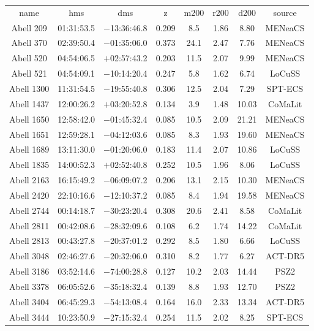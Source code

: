 \begin{table}
\begin{tabular}{cccccccc}
name & hms & dms & z & m200 & r200 & d200 & source \\
Abell 209 & 01:31:53.5 & $-$13:36:46.8 & 0.209 & 8.5 & 1.86 & 8.80 & MENeaCS \\
Abell 370 & 02:39:50.4 & $-$01:35:06.0 & 0.373 & 24.1 & 2.47 & 7.76 & MENeaCS \\
Abell 520 & 04:54:06.5 & $+$02:57:43.2 & 0.203 & 11.5 & 2.07 & 9.99 & MENeaCS \\
Abell 521 & 04:54:09.1 & $-$10:14:20.4 & 0.247 & 5.8 & 1.62 & 6.74 & LoCuSS \\
Abell 1300 & 11:31:54.5 & $-$19:55:40.8 & 0.306 & 12.5 & 2.04 & 7.29 & SPT-ECS \\
Abell 1437 & 12:00:26.2 & $+$03:20:52.8 & 0.134 & 3.9 & 1.48 & 10.03 & CoMaLit \\
Abell 1650 & 12:58:42.0 & $-$01:45:32.4 & 0.085 & 10.5 & 2.09 & 21.21 & MENeaCS \\
Abell 1651 & 12:59:28.1 & $-$04:12:03.6 & 0.085 & 8.3 & 1.93 & 19.60 & MENeaCS \\
Abell 1689 & 13:11:30.0 & $-$01:20:06.0 & 0.183 & 11.4 & 2.07 & 10.86 & LoCuSS \\
Abell 1835 & 14:00:52.3 & $+$02:52:40.8 & 0.252 & 10.5 & 1.96 & 8.06 & LoCuSS \\
Abell 2163 & 16:15:49.2 & $-$06:09:07.2 & 0.206 & 13.1 & 2.15 & 10.30 & MENeaCS \\
Abell 2420 & 22:10:16.6 & $-$12:10:37.2 & 0.085 & 8.4 & 1.94 & 19.58 & MENeaCS \\
Abell 2744 & 00:14:18.7 & $-$30:23:20.4 & 0.308 & 20.6 & 2.41 & 8.58 & CoMaLit \\
Abell 2811 & 00:42:08.6 & $-$28:32:09.6 & 0.108 & 6.2 & 1.74 & 14.22 & CoMaLit \\
Abell 2813 & 00:43:27.8 & $-$20:37:01.2 & 0.292 & 8.5 & 1.80 & 6.66 & LoCuSS \\
Abell 3048 & 02:46:27.6 & $-$20:32:06.0 & 0.310 & 8.2 & 1.77 & 6.27 & ACT-DR5 \\
Abell 3186 & 03:52:14.6 & $-$74:00:28.8 & 0.127 & 10.2 & 2.03 & 14.44 & PSZ2 \\
Abell 3378 & 06:05:52.6 & $-$35:18:32.4 & 0.139 & 8.8 & 1.93 & 12.70 & PSZ2 \\
Abell 3404 & 06:45:29.3 & $-$54:13:08.4 & 0.164 & 16.0 & 2.33 & 13.34 & ACT-DR5 \\
Abell 3444 & 10:23:50.9 & $-$27:15:32.4 & 0.254 & 11.5 & 2.02 & 8.25 & SPT-ECS \\

\end{tabular}
\end{table}
